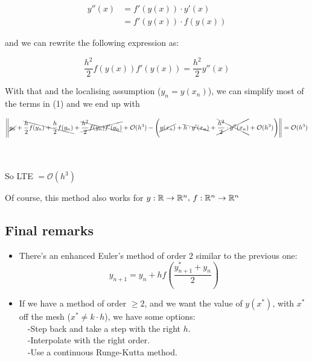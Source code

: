 \vspace{-0.5cm}

\begin{align*}
    y''(x) &= f'(y(x))\cdot y'(x) \\
           &= f'(y(x)) \cdot f(y(x))
\end{align*}

and we can rewrite the following expression as:

\[
  \frac{h^2}{2}f(y(x))f'(y(x)) = \frac{h^2}{2}y''(x)
\]

With that and the localising assumption ($y_n = y(x_n)$), we can simplify most of the terms in (1) and we end up with

\small

\[
  \left\lVert\cancel{y_n} + \bcancel{\frac{h}{2}f(y_n) + \frac{h}{2}f(y_n)} + \xcancel{\frac{h^2}{2}f(y_n)f'(y_n)} + \mathcal{O}(h^3)  - \left(\cancel{y(x_n)} + \bcancel{h\cdot y'(x_n)} + \xcancel{\frac{h^2}{2}\cdot y''(x_n)} + \mathcal{O}(h^3) \right)\right\rVert = \mathcal{O}(h^3)
\]

\normalsize
\-\\\\
So LTE $= \mathcal{O}(h^3)$\\

\begin{remark}
  Of course, this method also works for $y: \mathbb{R} \to \mathbb{R}^n, \, f:\mathbb{R}^n \to \mathbb{R}^n$
\end{remark}

\subsection{Final remarks}
\begin{itemize}
    \item There's an enhanced Euler's method of order $2$ similar to the previous one: $$\boxed{y_{n+1} = y_n + hf\left(\frac{y_{n+1}^* + y_n}{2}\right)}$$
    \item If we have a method of order $\geq 2$, and we want the value of $y(x^*)$, with $x^*$ off the mesh ($x^* \not= k\cdot h$), we have some options:\\
    
    $\quad$-Step back and take a step with the right $h$.\\
    
    $\quad$-Interpolate with the right order.\\
    
    $\quad$-Use a continuous Runge-Kutta method.
\end{itemize}
